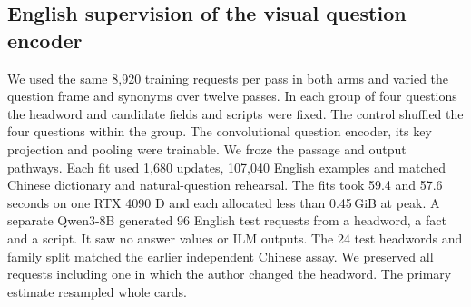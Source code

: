 \subsection*{English supervision of the visual question encoder}
We used the same 8,920 training requests per pass in both arms and varied the question frame and synonyms over twelve passes. In each group of four questions the headword and candidate fields and scripts were fixed. The control shuffled the four questions within the group. The convolutional question encoder, its key projection and pooling were trainable. We froze the passage and output pathways. Each fit used 1,680 updates, 107,040 English examples and matched Chinese dictionary and natural-question rehearsal. The fits took 59.4 and 57.6 seconds on one RTX 4090 D and each allocated less than 0.45\,GiB at peak. A separate Qwen3-8B generated 96 English test requests from a headword, a fact and a script. It saw no answer values or ILM outputs. The 24 test headwords and family split matched the earlier independent Chinese assay. We preserved all requests including one in which the author changed the headword. The primary estimate resampled whole cards.

